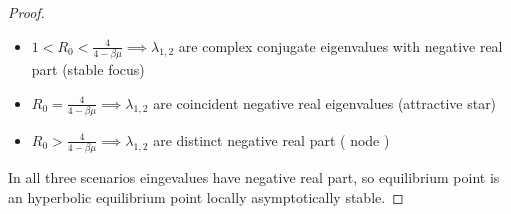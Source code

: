 \begin{proof}
\begin{itemize}
    \item $1 < R_0 < \frac{4}{4-\beta \mu} \implies \lambda_{1,2}$ are complex conjugate eigenvalues with negative real part (stable focus)
    
    \item $R_0 = \frac{4}{4-\beta \mu} \implies \lambda_{1,2}$ are coincident negative real eigenvalues (attractive star)
    
    \item $R_0 > \frac{4}{4-\beta \mu} \implies \lambda_{1,2}$ are distinct negative real part ( node )
\end{itemize}

In all three scenarios eingevalues have negative real part, so equilibrium point is an hyperbolic equilibrium point locally asymptotically stable.
\end{proof}